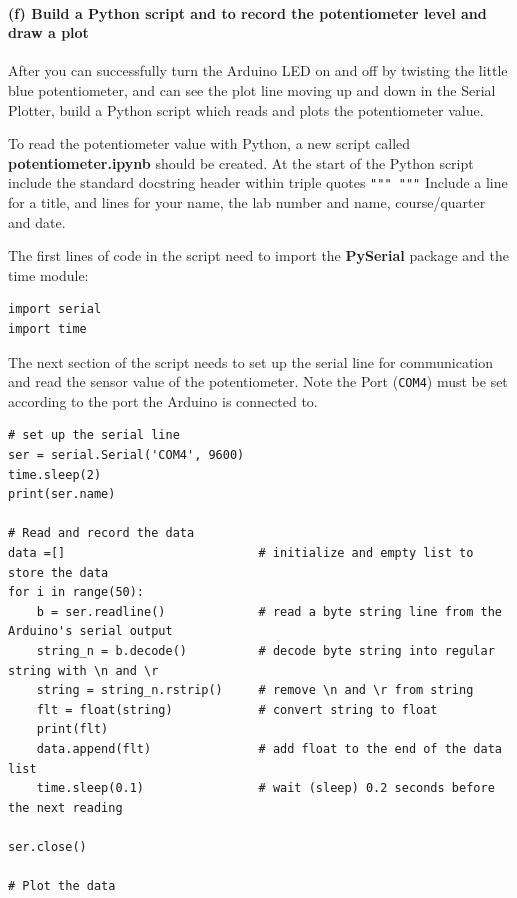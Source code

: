 \documentclass[11pt]{article}
\begin{document}
    \hypertarget{f-build-a-python-script-and-to-record-the-potentiometer-level-and-draw-a-plot}{%
\paragraph{(f) Build a Python script and to record the potentiometer
level and draw a
plot}\label{f-build-a-python-script-and-to-record-the-potentiometer-level-and-draw-a-plot}}

After you can successfully turn the Arduino LED on and off by twisting
the little blue potentiometer, and can see the plot line moving up and
down in the Serial Plotter, build a Python script which reads and plots
the potentiometer value.

To read the potentiometer value with Python, a new script called
\textbf{potentiometer.ipynb} should be created. At the start of the
Python script include the standard docstring header within triple quotes
\texttt{"""\ """} Include a line for a title, and lines for your name,
the lab number and name, course/quarter and date.

The first lines of code in the script need to import the
\textbf{PySerial} package and the time module:

\begin{verbatim}
import serial
import time
\end{verbatim}

The next section of the script needs to set up the serial line for
communication and read the sensor value of the potentiometer. Note the
Port (\texttt{\textquotesingle{}COM4\textquotesingle{}}) must be set
according to the port the Arduino is connected to.

\begin{verbatim}
# set up the serial line
ser = serial.Serial('COM4', 9600)
time.sleep(2)
print(ser.name)

# Read and record the data
data =[]                           # initialize and empty list to store the data
for i in range(50):
    b = ser.readline()             # read a byte string line from the Arduino's serial output
    string_n = b.decode()          # decode byte string into regular string with \n and \r 
    string = string_n.rstrip()     # remove \n and \r from string
    flt = float(string)            # convert string to float
    print(flt)
    data.append(flt)               # add float to the end of the data list
    time.sleep(0.1)                # wait (sleep) 0.2 seconds before the next reading

ser.close()

# Plot the data
\end{verbatim}
\end{document}
